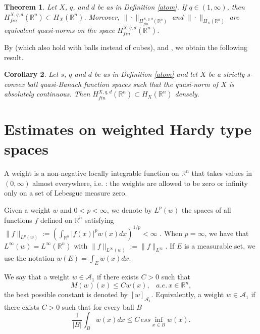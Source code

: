 \documentclass[oneside,10pt]{article}
\newtheorem{theorem}{Theorem}
\newtheorem{corollary}[theorem]{Corollary}
\begin{document}
\begin{theorem} \cite[Theorem 1.10]{Yan} \label{equiv quasi-norm}
Let $X$, $q$, and $d$ be as in Definition \ref{atom}. If $q \in (1, \infty)$, then 
$H^{X, q, d}_{fin}(\mathbb{R}^n) \subset H_{X}(\mathbb{R}^n)$. Moreover, $\| \cdot \|_{H^{X, q, d}_{fin}(\mathbb{R}^n)}$ 
and $\| \cdot \|_{H_{X}(\mathbb{R}^n)}$ are equivalent quasi-norms on the space $H^{X, q, d}_{fin}(\mathbb{R}^n)$.
\end{theorem}

By \cite[Theorems 3.6 and 3.7]{sawa} (which also hold with balls instead of cubes), and \cite[Corollary 3.11 - (ii)]{sawa}, we obtain the following result.

\begin{corollary} \label{dense set}
Let $s$, $q$ and $d$ be as in Definition \ref{atom} and let $X$ be a strictly $s$-convex ball quasi-Banach function spaces such that the quasi-norm of $X$ is absolutely continuous. Then $H^{X, q, d}_{fin}(\mathbb{R}^n) \subset H_{X}(\mathbb{R}^n)$ densely. 
\end{corollary}


\section{Estimates on weighted Hardy type spaces} \label{weighted estimates}

A weight is a non-negative locally integrable function on $\mathbb{R}^{n}$ that takes values in $(0, \infty)$ almost everywhere, i.e. : the weights are allowed to be zero or infinity only on a set of Lebesgue measure zero.

Given a weight $w$ and $0 < p < \infty$, we denote by $L^{p}(w)$ the spaces of all functions $f$ defined on $\mathbb{R}^n$ satisfying 
$\| f \|_{L^{p}(w)} := (\int_{\mathbb{R}^{n}} |f(x)|^{p} w(x) dx)^{1/p} < \infty$ . When $p=\infty$, we have that 
$L^{\infty}(w) = L^{\infty}(\mathbb{R}^{n})$ with $\| f \|_{L^{\infty}(w)} := \| f \|_{L^{\infty}}$. If $E$ is a measurable set, we use the notation $w(E) = \int_{E} w(x) dx$.

We say that a weight $w \in \mathcal{A}_1$ if there exists $C >  0$ such that
\begin{equation*}
M(w)(x) \leq C w(x), \,\,\,\,\, a.e. \, x \in \mathbb{R}^{n}, 
\end{equation*}
the best possible constant is denoted by $[w]_{\mathcal{A}_1}$. Equivalently, a weight $w \in \mathcal{A}_1$ if there exists $C >  0$ such that for every ball $B$
\begin{equation}
\frac{1}{|B|} \int_{B} w(x) dx \leq C \, ess\inf_{x \in B} w(x). \label{A1condequiv}
\end{equation}
\end{document}
